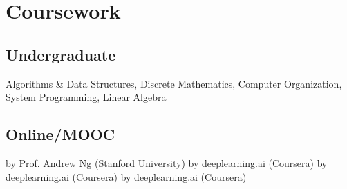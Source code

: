 
\section{Coursework}
\subsection{Undergraduate}
Algorithms \& Data Structures,
Discrete Mathematics,
Computer Organization,
System Programming,
Linear Algebra
\sectionsep

\subsection{Online/MOOC}
 by Prof. Andrew Ng (Stanford University)
 by deeplearning.ai (Coursera)
 by deeplearning.ai (Coursera)
 by deeplearning.ai (Coursera)
\sectionsep

